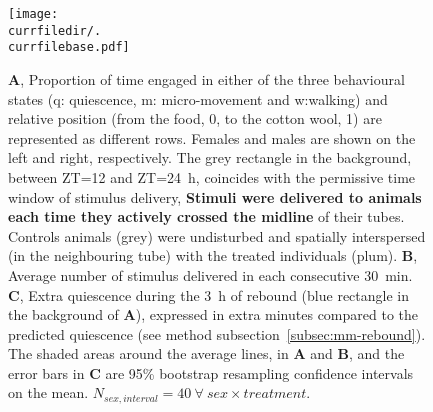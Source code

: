 \begin{figure}[h!]
	\centering   
	\texttt{[image: \\currfiledir/.\\currfilebase.pdf]}
    \caption[Stimuli do not account for rebounded quiescence]{
	\textbf{A}, Proportion of time engaged in either of the three behavioural states (q: quiescence, m: micro-movement and w:walking) and relative position (from the food, 0, to the cotton wool, 1) 
	are represented as different rows.
	Females and males are shown on the left and right, respectively.
	The grey rectangle in the background,
	between ZT=12 and ZT=24~h, %
	coincides with the permissive time window of stimulus delivery,
	\textbf{	Stimuli were delivered to animals each time they actively crossed the midline} of their tubes. %
	Controls animals (grey) were undisturbed and spatially interspersed (in the neighbouring tube) with the treated individuals (plum).
	\textbf{B}, Average number of stimulus delivered in each consecutive 30~min.
	\textbf{C}, Extra quiescence during the 3~h of rebound (blue rectangle in the background of \textbf{A}), expressed in extra minutes compared to the predicted quiescence (see method subsection~\ref{subsec:mm-rebound}).
	The shaded areas around the average lines, in \textbf{A} and \textbf{B}, and the error bars in \textbf{C} are 95\% bootstrap resampling confidence intervals on the mean.
	$N_{sex,interval} = 40~\forall~sex \times treatment$.
\label{fig:\currfilebase}
}
\end{figure}
